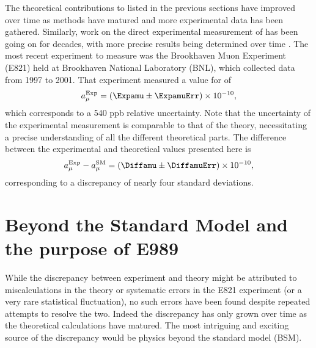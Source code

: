The theoretical contributions to \amu listed in the previous sections have improved over time as methods have matured and more experimental data has been gathered. Similarly, work on the direct experimental measurement of \amu has been going on for decades, with more precise results being determined over time \cite{PastExperiments}. The most recent experiment to measure \gmtwo was the Brookhaven Muon \gmtwo Experiment (E821) held at Brookhaven National Laboratory (BNL), which collected data from 1997 to 2001. That experiment measured a value for \amu of \cite{E821FinalReport,CODATA}
		\begin{align}
            a_{\mu}^{\text{Exp}} = (\Expamu \pm \ExpamuErr) \times 10^{-10},
		\end{align}
which corresponds to a 540 ppb relative uncertainty. Note that the uncertainty of the experimental measurement is comparable to that of the theory, necessitating a precise understanding of all the different theoretical parts. The difference between the experimental and theoretical values presented here is
		\begin{align}
            a_{\mu}^{\text{Exp}} - a_{\mu}^{\text{SM}} = (\Diffamu \pm \DiffamuErr) \times 10^{-10},
		\end{align}
corresponding to a discrepancy of nearly four standard deviations.



\section{Beyond the Standard Model and the purpose of E989}
\label{sec:BSM}


While the discrepancy between experiment and theory might be attributed to miscalculations in the theory or systematic errors in the E821 experiment (or a very rare statistical fluctuation), no such errors have been found despite repeated attempts to resolve the two. Indeed the discrepancy has only grown over time as the theoretical calculations have matured. The most intriguing and exciting source of the discrepancy would be physics beyond the standard model (BSM). 



